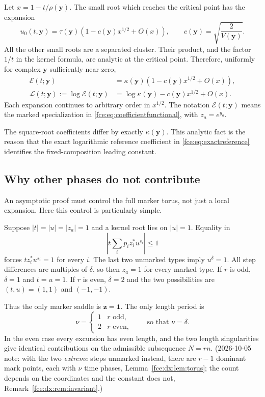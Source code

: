 \documentclass[11pt,a4paper]{article}
\numberwithin{equation}{section}
\theoremstyle{definition}\newtheorem{definition}[theorem]{Definition}
\theoremstyle{remark}\newtheorem{remark}[theorem]{Remark}
\newcommand{\E}{\mathcal E}
\newcommand{\Lcal}{\mathcal L}
\newcommand{\one}{\boldsymbol 1}
\begin{document}
Let $x=1-t/\rho(\boldsymbol y)$. The small root which reaches the critical
point has the expansion
\[
 u_0(t,\boldsymbol y)=\tau(\boldsymbol y)
 \left(1-c(\boldsymbol y)x^{1/2}+O(x)\right),\qquad
 c(\boldsymbol y)=\sqrt{\frac{2}{V(\boldsymbol y)}}.
\]
All the other small roots are a separated cluster. Their product, and the
factor $1/t$ in the kernel formula, are analytic at the critical point.
Therefore, uniformly for complex $\boldsymbol y$ sufficiently near zero,
\begin{align}
 \E(t;\boldsymbol y)
 &=\kappa(\boldsymbol y)
       \left(1-c(\boldsymbol y)x^{1/2}+O(x)\right),\label{fce:eq:Elocal}\\
 \Lcal(t;\boldsymbol y):=\log\E(t;\boldsymbol y)
 &=\log\kappa(\boldsymbol y)-c(\boldsymbol y)x^{1/2}+O(x).
 \label{fce:eq:Llocal}
\end{align}
Each expansion continues to arbitrary order in $x^{1/2}$. The notation
$\E(t;\boldsymbol y)$ means the marked specialization in
\eqref{fce:eq:coefficientfunctional}, with $z_a=e^{y_a}$.

The square-root coefficients differ by exactly
$\kappa(\boldsymbol y)$. This analytic fact is the reason that the exact
logarithmic reference coefficient in \eqref{fce:eq:exactreference} identifies
the fixed-composition leading constant.

\subsection{Why other phases do not contribute}
An asymptotic proof must control the full marker torus, not just a local
expansion. Here this control is particularly simple.

Suppose $|t|=|u|=|z_a|=1$ and a kernel root lies on $|u|=1$. Equality in
\[
 \left|t\sum_i p_i z_i^*u^{s_i}\right|\le1
\]
forces $t z_i^*u^{s_i}=1$ for every $i$. The last two unmarked types imply
$u^{\delta}=1$. All step differences are multiples of $\delta$, so then
$z_a=1$ for every marked type. If $r$ is odd, $\delta=1$ and $t=u=1$.
If $r$ is even, $\delta=2$ and the two possibilities are $(t,u)=(1,1)$
and $(-1,-1)$.

Thus the only marker saddle is $\boldsymbol z=\one$. The only length
period is
\begin{equation}\label{fce:eq:period}
 \nu=\begin{cases}1&r\text{ odd},\\2&r\text{ even},\end{cases}
 \qquad\text{so that }\nu=\delta.
\end{equation}
In the even case every excursion has even length, and the two length
singularities give identical contributions on the admissible subsequence
$N=rn$. (2026-10-05 note: with the two \emph{extreme} steps unmarked instead,
there are $r-1$ dominant mark points, each with $\nu$ time phases,
Lemma~\ref{fce:dx:lem:torus}; the count depends on the coordinates and the
constant does not, Remark~\ref{fce:dx:rem:invariant}.)
\end{document}
